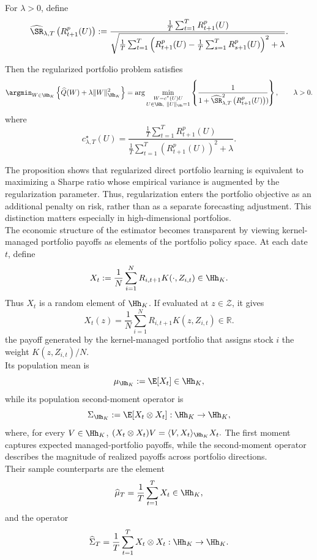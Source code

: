 \begin{proposition}
\label{prop:regularized_sharpe}

For $\lambda>0$, define
\[
\widehat{\SR}_{\lambda,T}
\left(R^p_{t+1}(U)\right)
:=
\frac{
\frac1T\sum_{t=1}^T R^p_{t+1}(U)
}{
\sqrt{
\frac1T\sum_{t=1}^T
\left(
R^p_{t+1}(U)
-\frac1T\sum_{s=1}^T R^p_{s+1}(U)
\right)^2+\lambda
}
}.
\]

Then the regularized portfolio problem satisfies
\[
\argmin_{W\in\Hh_K}
\left\{
\widehat Q(W)
+
\lambda\|W\|_{\Hh_K}^2
\right\}
=
\arg\min_{\substack{
W=c^\star(U)U\\
U\in\Hh,\ \|U\|_{\Hh}=1
}}
\left\{
\frac{1}{
1+\widehat{\SR}^2_{\lambda,T}
\left(R^p_{t+1}(U)\right))\!
}
\right\},
\qquad \lambda>0.

\]
where
\[
c^\star_{\lambda,T}(U)
=
\frac{
\frac1T\sum_{t=1}^T R^p_{t+1}(U)
}{
\frac1T\sum_{t=1}^T
(R^p_{t+1}(U))^2+\lambda
}.
\]
\end{proposition}
The proposition shows that regularized direct portfolio learning is equivalent to maximizing a Sharpe ratio whose empirical variance is augmented by the regularization parameter. Thus, regularization enters the portfolio objective as an additional penalty on risk, rather than as a separate forecasting adjustment.
This distinction matters especially in high-dimensional portfolios.\\


The economic structure of the estimator becomes transparent by viewing
kernel-managed portfolio payoffs as elements of the portfolio policy space.
At each date $t$, define
\[
X_t
:=
\frac{1}{N}
\sum_{i=1}^{N}
R_{i,t+1}K(\cdot,Z_{i,t})
\in\Hh_K.
\]
Thus $X_t$ is a random element of $\Hh_K$. If evaluated at
$z\in\mathscr Z$, it gives
\[
X_t(z)
=
\frac{1}{N}
\sum_{i=1}^{N}
R_{i,t+1}K(z,Z_{i,t}) \in \mathbb{R}.
\]
the payoff generated by the kernel-managed portfolio that assigns stock $i$
the weight $K(z,Z_{i,t})/N$.\\
Its population mean is
\[
\mu_{\Hh_K}
:=
\E[X_t]
\in\Hh_K,
\]
while its population second-moment operator is
\[
\Sigma_{\Hh_K}
:=
\E[X_t\otimes X_t]
:
\Hh_K\rightarrow\Hh_K,
\]
where, for every $V\in\Hh_K$,
$
(X_t\otimes X_t)V
=
\langle V,X_t\rangle_{\Hh_K}X_t.
$
The first moment captures expected managed-portfolio payoffs, while the
second-moment operator describes the magnitude of realized payoffs across
portfolio directions.\\
Their sample counterparts are the element
\[
\widehat\mu_T
=
\frac{1}{T}\sum_{t=1}^{T}X_t
\in\Hh_K,
\]
and the operator
\[
\widehat\Sigma_T
=
\frac{1}{T}\sum_{t=1}^{T}X_t\otimes X_t
:
\Hh_K\rightarrow\Hh_K.
\]


